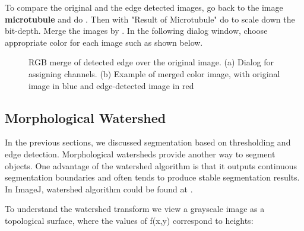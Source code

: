 \begin{indentexercise}{1}
To compare the original and the edge detected images, go back to the
image \textbf{microtubule} and do
. Then with "Result of Microtubule" do  
to scale down the bit-depth. Merge the images by
.
In the following dialog window, choose appropriate color for each
image such as shown below. 

\begin{figure}[H]
\centering
{}
\caption{ RGB merge of detected edge over the original
image. (a) Dialog for assigning channels. (b) Example of merged color image, with original image in blue and edge-detected image in red}
\label{fig:EdgeDetectChannelMerging}
\end{figure} 

\end{indentexercise}

\subsection{Morphological Watershed }
\label{sec:Watershed}
In the previous sections, we discussed segmentation based on thresholding and edge detection. Morphological watersheds provide another way to segment objects. One advantage of the watershed algorithm is that it outputs continuous segmentation boundaries and often tends to produce stable segmentation results. In ImageJ, watershed algorithm could be found at .

To understand the watershed transform we view a grayscale image as a
topological surface, where the values of f(x,y) correspond to heights:

